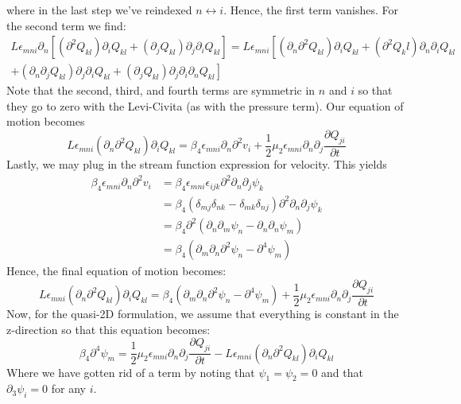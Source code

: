 \documentclass[reqno]{article}
\begin{document}
	where in the last step we've reindexed $n \leftrightarrow i$. Hence, the first term vanishes. For the second term we find:
	\begin{multline}
		L\epsilon_{mni}\partial_n\left[(\partial^2 Q_{kl}) \partial_i Q_{kl} + (\partial_j Q_{kl}) \partial_j \partial_i Q_{kl}\right] = L\epsilon_{mni} \left[ (\partial_n \partial^2 Q_{kl})\partial_i Q_{kl} + (\partial^2 Q_kl)\partial_n \partial_i Q_{kl} \right. \\ \left. + (\partial_n\partial_j Q_{kl})\partial_j\partial_i Q_{kl} + (\partial_j Q_{kl})\partial_j\partial_i\partial_n Q_{kl} \right]
	\end{multline}
	Note that the second, third, and fourth terms are symmetric in $n$ and $i$ so that they go to zero with the Levi-Civita (as with the pressure term). Our equation of motion becomes
	\begin{equation}
		L\epsilon_{mni}(\partial_n \partial^2 Q_{kl})\partial_i Q_{kl} = \beta_4 \epsilon_{mni}\partial_n \partial^2 v_i + \frac{1}{2} \mu_2 \epsilon_{mni} \partial_n \partial_j \frac{\partial Q_{ji}}{\partial t}
	\end{equation}
	Lastly, we may plug in the stream function expression for velocity. This yields
	\begin{equation}
	\begin{split}
		\beta_4 \epsilon_{mni}\partial_n\partial^2 v_i &= \beta_4 \epsilon_{mni}\epsilon_{ijk}\partial^2\partial_n\partial_j \psi_k \\
		&= \beta_4 (\delta_{mj}\delta_{nk} - \delta_{mk}\delta_{nj}) \partial^2\partial_n\partial_j \psi_k \\
		&= \beta_4 \partial^2 \left( \partial_n \partial_m \psi_n - \partial_n \partial_n \psi_m \right) \\
		&= \beta_4 \left( \partial_m \partial_n \partial^2 \psi_n - \partial^4 \psi_m \right)
	\end{split}
	\end{equation}
	Hence, the final equation of motion becomes:
	\begin{equation}
		L\epsilon_{mni}(\partial_n \partial^2 Q_{kl})\partial_i Q_{kl} = \beta_4 \left( \partial_m \partial_n \partial^2 \psi_n - \partial^4 \psi_m \right) + \frac{1}{2} \mu_2 \epsilon_{mni} \partial_n \partial_j \frac{\partial Q_{ji}}{\partial t}
	\end{equation}
	Now, for the quasi-2D formulation, we assume that everything is constant in the z-direction so that this equation becomes:
	\begin{equation} \label{eq:visceq}
		\beta_4 \partial^4 \psi_m = \frac{1}{2} \mu_2 \epsilon_{mni} \partial_n \partial_j \frac{\partial Q_{ji}}{\partial t} - L\epsilon_{mni}(\partial_n \partial^2 Q_{kl})\partial_i Q_{kl}
	\end{equation}
	Where we have gotten rid of a term by noting that $\psi_1 = \psi_2 = 0$ and that $\partial_3 \psi_i = 0$ for any $i$. 
	
\end{document}
